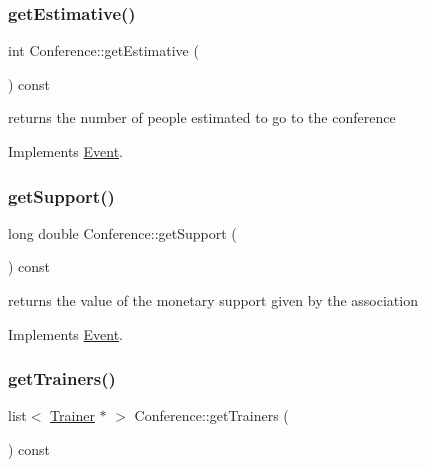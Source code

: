 \subsubsection{\texorpdfstring{get\+Estimative()}{getEstimative()}}
{\footnotesize\ttfamily int Conference\+::get\+Estimative (\begin{DoxyParamCaption}{ }\end{DoxyParamCaption}) const\hspace{0.3cm}{\ttfamily [virtual]}}



returns the number of people estimated to go to the conference 



Implements \mbox{\hyperlink{classEvent_a18ac55c239f648fc0ad5687c426f2a8f}{Event}}.

\mbox{\label{classConference_a6ca3f0f7b2714881dbc108ea7f08646f}} 
\subsubsection{\texorpdfstring{get\+Support()}{getSupport()}}
{\footnotesize\ttfamily long double Conference\+::get\+Support (\begin{DoxyParamCaption}{ }\end{DoxyParamCaption}) const\hspace{0.3cm}{\ttfamily [virtual]}}



returns the value of the monetary support given by the association 



Implements \mbox{\hyperlink{classEvent_a9170bfcbd9b00015dafc5d5cc69a2cfe}{Event}}.

\mbox{\label{classConference_aae9e92d48205a80fa42e94564e3568c5}} 
\subsubsection{\texorpdfstring{get\+Trainers()}{getTrainers()}}
{\footnotesize\ttfamily list$<$ \mbox{\hyperlink{classTrainer}{Trainer}} $\ast$ $>$ Conference\+::get\+Trainers (\begin{DoxyParamCaption}{ }\end{DoxyParamCaption}) const\hspace{0.3cm}{\ttfamily [virtual]}}



